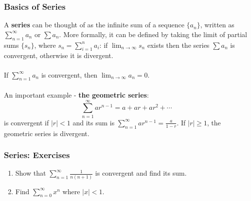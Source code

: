 \documentclass{beamer}
\begin{document}
\begin{frame}
\frametitle{Basics of Series}
A \textbf{series} can be thought of as the infinite sum of a sequence $\{a_n\}$, written as $\sum_{n=1}^{\infty} a_n$ or $\sum a_n$. More formally, it can be defined by taking the limit of partial sums $\{s_n\}$, where $s_n = \sum_{i=1}^{n} a_i$: if $\lim_{n \rightarrow \infty} s_n$ exists then the series $\sum a_n$ is convergent, otherwise it is divergent.
\\~\\
If $\sum_{n=1}^{\infty} a_n$ is convergent, then $\lim_{n \rightarrow \infty} a_n = 0$.
\\~\\
An important example - \textbf{the geometric series}:\\
$$
\sum_{n=1}^{\infty} ar^{n-1} = a + ar + ar^2 + \cdots
$$
is convergent if $\vert r \vert < 1$ and its sum is 
$\sum_{n=1}^{\infty} ar^{n-1} = \frac{a}{1-r}$.
If $\vert r \vert \geq 1$, the geometric series is divergent.
\end{frame}

\begin{frame}
\frametitle{Series: Exercises}
\begin{enumerate}
\item Show that $\sum_{n=1}^{\infty} \frac{1}{n(n+1)}$ is convergent and find its sum.
\vspace*{1.2in}
\item Find $\sum_{n=0}^{\infty} x^n$ where $\vert x \vert < 1$.
\vspace*{1.2in}
\end{enumerate}
\end{frame}
\end{document}
